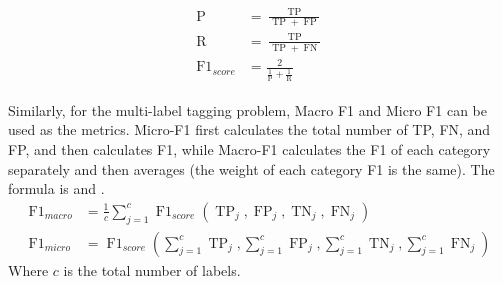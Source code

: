 \begin{align}\label{fml:f1score}
    \begin{split}
        \operatorname{P}          & =\frac{\operatorname{TP}}{\operatorname{TP}+\operatorname{FP}}    \\
        \operatorname{R}          & =\frac{\operatorname{TP}}{\operatorname{TP}+\operatorname{FN}}    \\
        \operatorname{F1}_{score} & = \frac{2}{\frac{1}{\operatorname{P}}+\frac{1}{\operatorname{R}}}
    \end{split}
\end{align}


Similarly, for the multi-label tagging problem, Macro F1 and Micro F1 can be used as the metrics. Micro-F1 first calculates the total number of TP, FN, and FP, and then calculates F1, while Macro-F1 calculates the F1 of each category separately and then averages (the weight of each category F1 is the same). The formula is \eqname{\ref{fml:f1-macro}} and \eqname{\ref{fml:f1-micro}}.
\begin{align}
    \operatorname{F1}_{macro} & =\frac{1}{c} \sum_{j=1}^{c} \operatorname{F1}_{score}(\operatorname{TP}_{j}, \operatorname{FP}_{j}, \operatorname{TN}_{j}, \operatorname{FN}_{j}) \label{fml:f1-macro}                                  \\
    \operatorname{F1}_{micro} & =\operatorname{F1}_{score}(\sum_{j=1}^{c} \operatorname{TP}_{j}, \sum_{j=1}^{c} \operatorname{FP}_{j}, \sum_{j=1}^{c} \operatorname{TN}_{j}, \sum_{j=1}^{c} \operatorname{FN}_{j}) \label{fml:f1-micro}
\end{align}
Where \(c\) is the total number of labels.


